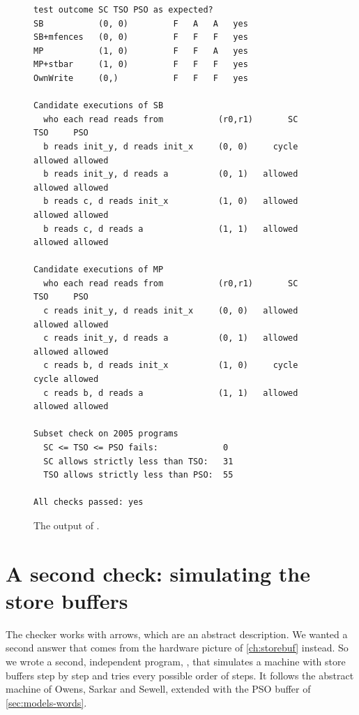 \begin{figure}[!htbp]
\centering
\begin{lstlisting}[style=vscode]
test outcome SC TSO PSO as expected?
SB           (0, 0)         F   A   A   yes
SB+mfences   (0, 0)         F   F   F   yes
MP           (1, 0)         F   F   A   yes
MP+stbar     (1, 0)         F   F   F   yes
OwnWrite     (0,)           F   F   F   yes

Candidate executions of SB
  who each read reads from           (r0,r1)       SC     TSO     PSO
  b reads init_y, d reads init_x     (0, 0)     cycle allowed allowed
  b reads init_y, d reads a          (0, 1)   allowed allowed allowed
  b reads c, d reads init_x          (1, 0)   allowed allowed allowed
  b reads c, d reads a               (1, 1)   allowed allowed allowed

Candidate executions of MP
  who each read reads from           (r0,r1)       SC     TSO     PSO
  c reads init_y, d reads init_x     (0, 0)   allowed allowed allowed
  c reads init_y, d reads a          (0, 1)   allowed allowed allowed
  c reads b, d reads init_x          (1, 0)     cycle   cycle allowed
  c reads b, d reads a               (1, 1)   allowed allowed allowed

Subset check on 2005 programs
  SC <= TSO <= PSO fails:             0
  SC allows strictly less than TSO:   31
  TSO allows strictly less than PSO:  55

All checks passed: yes
\end{lstlisting}
\caption{The output of .}
\label{fig:checkout}
\end{figure}

\section{A second check: simulating the store buffers}
\label{sec:sim}

The checker works with arrows, which are an abstract description. We wanted a second answer that comes from the hardware picture of \cref{ch:storebuf} instead. So we wrote a second, independent program, , that simulates a machine with store buffers step by step and tries every possible order of steps. It follows the abstract machine of Owens, Sarkar and Sewell\cite{owens2009better}, extended with the PSO buffer of \cref{sec:models-words}.

